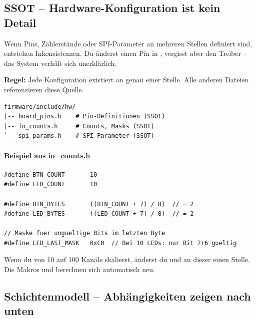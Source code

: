 \subsection{SSOT -- Hardware-Konfiguration ist kein \glqq Detail\grqq}
\label{subsec:ssot-prinzip}

Wenn Pins, Zählerstände oder SPI-Parameter an mehreren Stellen definiert sind,
entstehen Inkonsistenzen. Du änderst einen Pin in , vergisst aber
den Treiber -- das System verhält sich unerklärlich.

\textbf{Regel:} Jede Konfiguration existiert an genau einer Stelle. Alle anderen
Dateien referenzieren diese Quelle.

\begin{lstlisting}[style=shell,numbers=none,caption={SSOT-Verzeichnisstruktur},label={lst:ssot-struktur}]
firmware/include/hw/
|-- board_pins.h    # Pin-Definitionen (SSOT)
|-- io_counts.h     # Counts, Masks (SSOT)
`-- spi_params.h    # SPI-Parameter (SSOT)
\end{lstlisting}

\paragraph{Beispiel aus io\_counts.h}

\begin{lstlisting}[style=arduino,caption={SSOT für Counts und Masken},label={lst:io-counts}]
#define BTN_COUNT       10
#define LED_COUNT       10

#define BTN_BYTES       ((BTN_COUNT + 7) / 8)  // = 2
#define LED_BYTES       ((LED_COUNT + 7) / 8)  // = 2

// Maske fuer ungueltige Bits im letzten Byte
#define LED_LAST_MASK   0xC0  // Bei 10 LEDs: nur Bit 7+6 gueltig
\end{lstlisting}

\begin{infobox}[Konsequenz]
Wenn du von 10 auf 100 Kanäle skalierst, änderst du  und
 an dieser einen Stelle. Die Makros  und
 berechnen sich automatisch neu.
\end{infobox}

\subsection{Schichtenmodell -- Abhängigkeiten zeigen nach unten}
\label{subsec:schichtenmodell}

